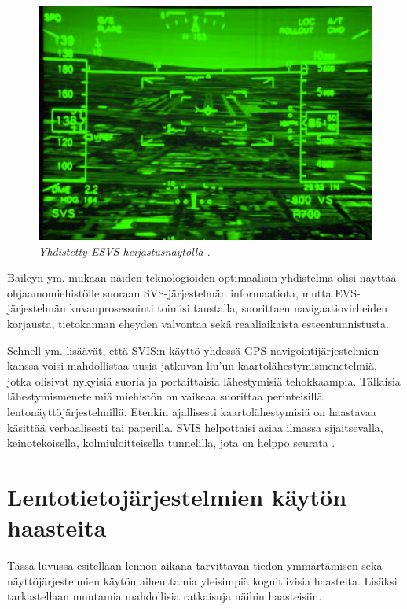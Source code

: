 \documentclass[utf8,bachelor,manualbib]{gradu3}
\begin{document}
\begin{figure}[t]
\centering
\includegraphics[width=12cm]{HUD_Fused.png}
\caption{\itshape Yhdistetty ESVS heijastusnäytöllä \citep{baileyym2007}.}
\label{F:ESVS}
\end{figure}

Baileyn ym.\citeyearpar{baileyym2007} mukaan näiden teknologioiden optimaalisin yhdistelmä olisi näyttää ohjaamomiehistölle suoraan SVS-järjestelmän informaatiota, mutta EVS-järjestelmän kuvanprosessointi toimisi taustalla, suorittaen navigaatiovirheiden korjausta, tietokannan eheyden valvontaa sekä reaaliaikaista esteentunnistusta.

Schnell ym. \citeyearpar{schnellym2004} lisäävät, että SVIS:n käyttö yhdessä GPS-navigointijärjestelmien kanssa voisi mahdollistaa uusia jatkuvan liu'un kaartolähestymismenetelmiä, jotka olisivat nykyisiä suoria ja portaittaisia lähestymisiä tehokkaampia. Tällaisia lähestymismenetelmiä miehistön on vaikeaa suorittaa perinteisillä lentonäyttöjärjestelmillä. Etenkin ajallisesti kaartolähestymisiä on haastavaa käsittää verbaalisesti tai paperilla. SVIS helpottaisi asiaa ilmassa sijaitsevalla, keinotekoisella, kolmiuloitteisella tunnelilla, jota on helppo seurata \citep{barrowspowell1999}.

\chapter{Lentotietojärjestelmien käytön haasteita}

Tässä luvussa esitellään lennon aikana tarvittavan tiedon ymmärtämisen sekä näyttöjärjestelmien käytön aiheuttamia yleisimpiä kognitiivisia haasteita. Lisäksi tarkastellaan muutamia mahdollisia ratkaisuja näihin haasteisiin.
\end{document}
